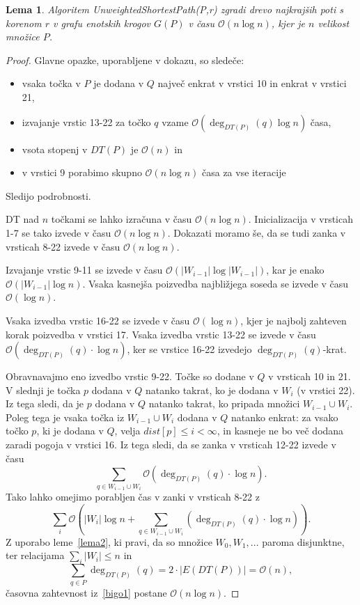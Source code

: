 \documentclass[a4paper, 12pt]{book}
\newcommand{\OO}{\ensuremath{\mathcal{O}}} %
\newtheorem{lema}[izrek]{Lema}
\begin{document}
\begin{lema}
\label{lema3}
Algoritem \textit{Unweigh\-ted\-Shor\-test\-Path(P,r)} zgradi drevo najkrajših poti s korenom $r$ v grafu enotskih krogov $G(P)$ v času $\OO(n\log n)$, kjer je $n$ velikost množice $P$.
\end{lema}

\begin{proof}
Glavne opazke, uporabljene v dokazu, so sledeče:
\begin{itemize}
\item vsaka točka v $P$ je dodana v $Q$ največ enkrat v vrstici 10 in enkrat v vrstici 21,
\item izvajanje vrstic 13-22 za točko $q$ vzame $\OO(\deg_{DT(P)}(q)\log n)$ časa,
\item vsota stopenj v $DT(P)$ je $\OO(n)$ in
\item v vrstici 9 porabimo skupno $\OO(n\log n)$ časa za vse iteracije
\end{itemize}
Sledijo podrobnosti.

DT nad $n$ točkami se lahko izračuna v času $\OO(n\log n)$. Inicializacija v vrsticah 1-7 se tako izvede v času $\OO(n\log n)$. Dokazati moramo še, da se tudi zanka v vrsticah 8-22 izvede v času $\OO(n\log n)$.

Izvajanje vrstic 9-11 se izvede v času $\OO(|W_{i-1}|\log |W_{i-1}|)$, kar je enako $\OO(|W_{i-1}|\log n)$. Vsaka kasnejša poizvedba najbližjega soseda se izvede v času $\OO(\log n)$.

Vsaka izvedba vrstic 16-22 se izvede v času $\OO(\log n)$, kjer je najbolj zahteven korak poizvedba v vrstici 17. Vsaka izvedba vrstic 13-22 se izvede v času $\OO(\deg_{DT(P)}(q)\cdot\log n)$, ker se vrstice 16-22 izvedejo $\deg_{DT(P)}(q)$-krat.

Obravnavajmo eno izvedbo vrstic 9-22. Točke so dodane v $Q$ v vrsticah 10 in 21. V slednji je točka $p$ dodana v $Q$ natanko takrat, ko je dodana v $W_i$ (v vrstici 22). Iz tega sledi, da je $p$ dodana v $Q$ natanko takrat, ko pripada množici $W_{i-1}\cup W_i$. Poleg tega je vsaka točka iz $W_{i-1}\cup W_i$ dodana v $Q$ natanko enkrat: za vsako točko $p$, ki je dodana v $Q$, velja $dist[p]\leq i < \infty$, in kasneje ne bo več dodana zaradi pogoja v vrstici 16. Iz tega sledi, da se zanka v vrsticah 12-22 izvede v času
\begin{equation*}
\sum_{q\in W_{i-1}\cup W_i} \OO(\deg_{DT(P)}(q) \cdot \log n).
\end{equation*}
Tako lahko omejimo porabljen čas v zanki v vrsticah 8-22 z
\begin{equation}
\label{bigo1}
\sum_i \OO \left( |W_i|\log n + \sum_{q\in W_{i-1}\cup W_i} (\deg_{DT(P)}(q) \cdot \log n) \right) .
\end{equation}
Z uporabo leme~\ref{lema2}, ki pravi, da so množice $W_0,W_1,...$ paroma disjunktne, ter relacijama $\sum_i |W_i| \leq n$ in 
\begin{equation*}
\sum_{q \in P} \deg_{DT(P)}(q) = 2 \cdot |E(DT(P))| = \OO(n),
\end{equation*}
časovna zahtevnost iz~\eqref{bigo1} postane $\OO(n\log n)$.
\end{proof}
\end{document}

